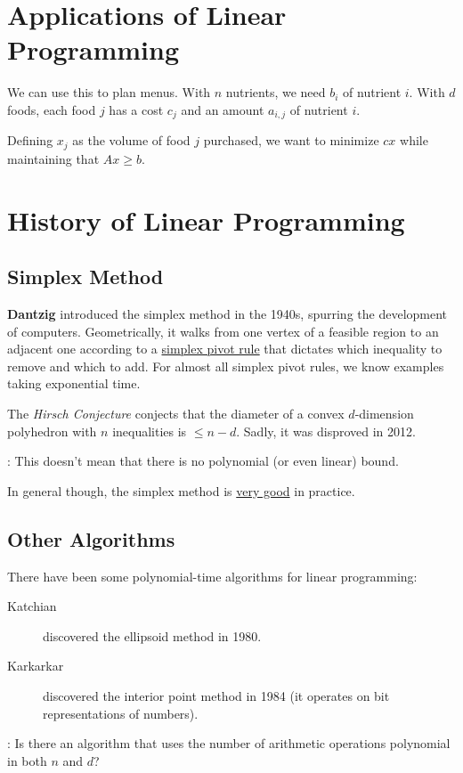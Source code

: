             \section{Applications of Linear Programming} %
            \label{sec:applications_of_linear_programming}
                We can use this to plan menus.
                With $n$ nutrients, we need $b_i$ of nutrient $i$.
                With $d$ foods, each food $j$ has a cost $c_j$ and an amount $a_{i,j}$ of nutrient $i$.

                Defining $x_j$ as the volume of food $j$ purchased, we want to minimize $cx$ while maintaining that $Ax \ge b$.
            \section{History of Linear Programming} %
            \label{sec:history_of_linear_programming}
                \subsection{Simplex Method} %
                \label{sub:simplex_method}

                    \textbf{Dantzig} introduced the simplex method in the 1940s, spurring the development of computers.
                    Geometrically, it walks from one vertex of a feasible region to an adjacent one according to a \uline{simplex pivot rule} that dictates which inequality to remove and which to add.
                    For almost all simplex pivot rules, we know examples taking exponential time.

                    The \textit{Hirsch Conjecture} conjects that the diameter of a convex $d$-dimension polyhedron with $n$ inequalities is $\le n - d$.
                    Sadly, it was disproved in 2012.

                    \open: This doesn't mean that there is no polynomial (or even linear) bound.

                    In general though, the simplex method is \uline{very good} in practice.
                \subsection{Other Algorithms} %
                \label{sub:other_algorithms}
                    There have been some polynomial-time algorithms for linear programming:
                    \begin{description}
                        \item[Katchian] discovered the ellipsoid method in 1980.
                        \item[Karkarkar] discovered the interior point method in 1984 (it operates on bit representations of numbers).
                    \end{description}
                    \open: Is there an algorithm that uses the number of arithmetic operations polynomial in both $n$ and $d$?

